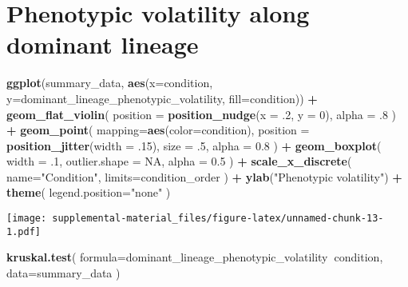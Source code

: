 \documentclass[]{book}
\newenvironment{Shaded}{\begin{snugshade}}{\end{snugshade}}
\newcommand{\DataTypeTok}[1]{\textcolor[rgb]{0.13,0.29,0.53}{#1}}
\newcommand{\DecValTok}[1]{\textcolor[rgb]{0.00,0.00,0.81}{#1}}
\newcommand{\FloatTok}[1]{\textcolor[rgb]{0.00,0.00,0.81}{#1}}
\newcommand{\KeywordTok}[1]{\textcolor[rgb]{0.13,0.29,0.53}{\textbf{#1}}}
\newcommand{\NormalTok}[1]{#1}
\newcommand{\OperatorTok}[1]{\textcolor[rgb]{0.81,0.36,0.00}{\textbf{#1}}}
\newcommand{\OtherTok}[1]{\textcolor[rgb]{0.56,0.35,0.01}{#1}}
\newcommand{\StringTok}[1]{\textcolor[rgb]{0.31,0.60,0.02}{#1}}
\begin{document}
\hypertarget{phenotypic-volatility-along-dominant-lineage}{%
\section{Phenotypic volatility along dominant lineage}\label{phenotypic-volatility-along-dominant-lineage}}

\begin{Shaded}
\begin{Highlighting}[]
\KeywordTok{ggplot}\NormalTok{(summary_data, }\KeywordTok{aes}\NormalTok{(}\DataTypeTok{x=}\NormalTok{condition, }\DataTypeTok{y=}\NormalTok{dominant_lineage_phenotypic_volatility, }\DataTypeTok{fill=}\NormalTok{condition)) }\OperatorTok{+}
\StringTok{  }\KeywordTok{geom_flat_violin}\NormalTok{(}
    \DataTypeTok{position =} \KeywordTok{position_nudge}\NormalTok{(}\DataTypeTok{x =} \FloatTok{.2}\NormalTok{, }\DataTypeTok{y =} \DecValTok{0}\NormalTok{),}
    \DataTypeTok{alpha =} \FloatTok{.8}
\NormalTok{  ) }\OperatorTok{+}
\StringTok{  }\KeywordTok{geom_point}\NormalTok{(}
    \DataTypeTok{mapping=}\KeywordTok{aes}\NormalTok{(}\DataTypeTok{color=}\NormalTok{condition),}
    \DataTypeTok{position =} \KeywordTok{position_jitter}\NormalTok{(}\DataTypeTok{width =} \FloatTok{.15}\NormalTok{),}
    \DataTypeTok{size =} \FloatTok{.5}\NormalTok{,}
    \DataTypeTok{alpha =} \FloatTok{0.8}
\NormalTok{  ) }\OperatorTok{+}
\StringTok{  }\KeywordTok{geom_boxplot}\NormalTok{(}
    \DataTypeTok{width =} \FloatTok{.1}\NormalTok{,}
    \DataTypeTok{outlier.shape =} \OtherTok{NA}\NormalTok{,}
    \DataTypeTok{alpha =} \FloatTok{0.5}
\NormalTok{  ) }\OperatorTok{+}
\StringTok{  }\KeywordTok{scale_x_discrete}\NormalTok{(}
    \DataTypeTok{name=}\StringTok{"Condition"}\NormalTok{,}
    \DataTypeTok{limits=}\NormalTok{condition_order}
\NormalTok{  ) }\OperatorTok{+}
\StringTok{  }\KeywordTok{ylab}\NormalTok{(}\StringTok{"Phenotypic volatility"}\NormalTok{) }\OperatorTok{+}
\StringTok{  }\KeywordTok{theme}\NormalTok{(}
    \DataTypeTok{legend.position=}\StringTok{"none"}
\NormalTok{  )}
\end{Highlighting}
\end{Shaded}

\texttt{[image: supplemental-material\_files/figure-latex/unnamed-chunk-13-1.pdf]}

\begin{Shaded}
\begin{Highlighting}[]
\KeywordTok{kruskal.test}\NormalTok{(}
  \DataTypeTok{formula=}\NormalTok{dominant_lineage_phenotypic_volatility}\OperatorTok{~}\NormalTok{condition,}
  \DataTypeTok{data=}\NormalTok{summary_data}
\NormalTok{)}
\end{Highlighting}
\end{Shaded}
\end{document}
